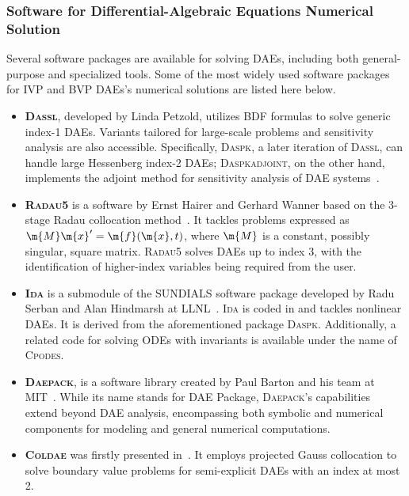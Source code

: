 \subsubsection{Software for Differential-Algebraic Equations Numerical Solution}

Several software packages are available for solving \acp{DAE}, including both general-purpose and specialized tools. Some of the most widely used software packages for \ac{IVP} and \ac{BVP} \acp{DAE}'s numerical solutions are listed here below.
%
\begin{itemize}
  \setlength{\itemsep}{0.0em}
  \item \textbf{\textsc{Dassl}}, developed by Linda Petzold, utilizes \ac{BDF} formulas to solve generic index-1 \acp{DAE}. Variants tailored for large-scale problems and sensitivity analysis are also accessible. Specifically, \textsc{Daspk}, a later iteration of \textsc{Dassl}, can handle large Hessenberg index-2 \acp{DAE}; \textsc{Daspkadjoint}, on the other hand, implements the adjoint method for sensitivity analysis of \ac{DAE} systems~\cite{brenan1995numerical}.
  \item \textbf{\textsc{Radau5}} is a software by Ernst Hairer and Gerhard Wanner based on the 3-stage Radau collocation method~\cite{hairer1999stiff}. It tackles problems expressed as $\m{M}\m{x}^{\prime} = \m{f}(\m{x}, t)$, where $\m{M}$ is a constant, possibly singular, square matrix. \textsc{Radau5} solves \acp{DAE} up to index 3, with the identification of higher-index variables being required from the user.
  \item \textbf{\textsc{Ida}} is a submodule of the \ac{SUNDIALS} software package developed by Radu Serban and Alan Hindmarsh at \ac{LLNL}~\cite{hindmarsh2005sundials, gardner2022sundials}. \textsc{Ida} is coded in \cc{} and tackles nonlinear \acp{DAE}. It is derived from the aforementioned \Fortran{} package \textsc{Daspk}. Additionally, a related code for solving \acp{ODE} with invariants is available under the name of \textsc{Cpodes}.
  \item \textbf{\textsc{Daepack}}, is a software library created by Paul Barton and his team at \ac{MIT}~\cite{tolsma2000daepack}. While its name stands for \ac{DAE} Package, \textsc{Daepack}'s capabilities extend beyond \ac{DAE} analysis, encompassing both symbolic and numerical components for modeling and general numerical computations.
  \item \textbf{\textsc{Coldae}} was firstly presented in~\cite{bader1987new}. It employs projected Gauss collocation to solve boundary value problems for semi-explicit \acp{DAE} with an index at most 2.
\end{itemize}

